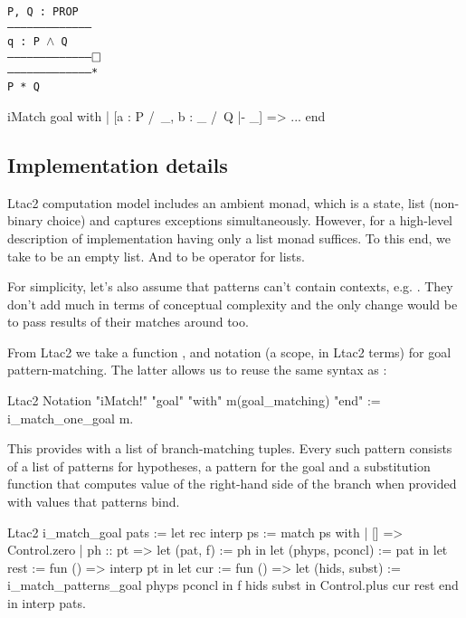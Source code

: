 \begin{itemize}
\begin{minipage}{\linewidth}
\texttt{P, Q : PROP\\
---------------------------------------\\
q : P $\wedge$ Q\\
---------------------------------------$\mathop{\Box}$\\
---------------------------------------*\\
P * Q
}
\end{minipage}

\begin{coq}
iMatch goal with
| [a : P /\ _, b : _ /\ Q |- _] => ...
end
\end{coq}
\end{itemize}


\subsection{Implementation details}
\label{subsec:implementation_details}

Ltac2 computation model includes an ambient monad, which is a state, list (non-binary choice) and captures exceptions simultaneously.
However, for a high-level description of implementation having only a list monad  suffices.
To this end, we take  to be an empty list.
And  to be  operator for lists.

For simplicity, let's also assume that patterns can't contain contexts, e.g. .
They don't add much in terms of conceptual complexity and the only change would be to pass results of their matches around too.

From Ltac2 we take a function ,  and notation (a scope, in Ltac2 terms) for goal pattern-matching.
The latter allows us to reuse the same syntax as :
\begin{coq}
Ltac2 Notation "iMatch!" "goal" "with" m(goal_matching) "end" :=
  i_match_one_goal m.
\end{coq}
This provides  with a list of branch-matching tuples.
Every such pattern consists of a list of patterns for hypotheses, a pattern for the goal and a substitution function that computes value of the right-hand side of the branch when provided with values that patterns bind.

\begin{coq}
Ltac2 i_match_goal pats :=
  let rec interp ps := match ps with
  | [] => Control.zero
  | ph :: pt =>
    let (pat, f) := ph in
    let (phyps, pconcl) := pat in
    let rest := fun () => interp pt in
    let cur := fun () =>
      let (hids, subst) := i_match_patterns_goal phyps pconcl in
      f hids subst
    in Control.plus cur rest
  end in
  interp pats.
\end{coq}

